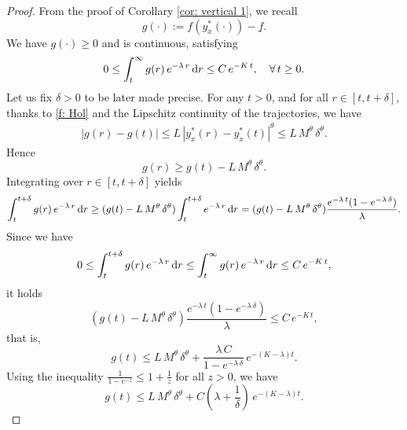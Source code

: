 \documentclass[12pt]{amsart}
\newcommand{\D}[1]{\mbox{\rm #1}}
\newcommand{\dd}{\D{d}}
\numberwithin{equation}{section}
\theoremstyle{plain}
\begin{document}
\begin{proof}
From the proof of Corollary \ref{cor: vertical 1}, we recall 
\begin{equation*}
    g(\cdot):= f(y_{x}^{*}(\cdot)) - \underline{f}.
\end{equation*}
We have $g(\cdot) \geq 0$ and is continuous, satisfying 
\begin{equation*}
    0\leq \int_{t}^{\infty} g(r)\,e^{-\lambda \,r}\,\dd r \leq C\, e^{-K\,t}, \quad \forall\,t\geq 0.
\end{equation*}
Let us fix $\delta>0$ to be later made precise. For any $t>0$, and for all $r\in [t,t+\delta]$, thanks to \ref{f: Hol} and the Lipschitz continuity of the trajectories, we have 
\begin{equation*}
\begin{aligned}
    |g(r) - g(t)| 
    \leq L \, |y_{x}^{*}(r) - y_{x}^{*}(t)|^{\theta} \leq L \, M^{\theta}\,\delta^{\theta}.
\end{aligned}
\end{equation*}
Hence
\begin{equation*}
    g(r) \geq g(t) - L\,M^{\theta}\,\delta^{\theta}.
\end{equation*}
Integrating over $r \in [t,t+\delta]$ yields
\begin{equation}
\label{eq: vertical_g}
    \int_{t}^{t+\delta} g(r)\,e^{-\lambda\,r}\,\dd r \geq (g(t) - L\,M^{\theta}\,\delta^{\theta}) \int_{t}^{t+\delta} e^{-\lambda\,r}\,\dd r = (g(t) - L\,M^{\theta}\,\delta^{\theta}) \frac{e^{-\lambda\,t} (1 - e^{-\lambda\,\delta})}{\lambda}.
\end{equation}
Since we have
\begin{equation*}
    0\leq \int_{t}^{t+\delta} g(r)\,e^{-\lambda\,r}\,\dd r
    \leq \int_{t}^{\infty} g(r)\,e^{-\lambda\,r}\,\dd r \leq C\, e^{-K\,t},
\end{equation*}
it holds
\begin{equation*}
    (g(t) - L\,M^{\theta}\,\delta^{\theta}) \frac{e^{-\lambda\,t} (1 - e^{-\lambda\,\delta})}{\lambda} 
    \leq C\, e^{-K\,t},
\end{equation*}
that is,
\begin{equation*}
    g(t) \leq L\,M^{\theta}\,\delta^{\theta} + \frac{\lambda\,C}{1 - e^{-\lambda\,\delta}}\, e^{-(K-\lambda)t}.
\end{equation*}
Using the inequality $\frac{1}{1-e^{-z}} \leq 1 + \frac{1}{z}$ for all $z>0$, we have
\begin{equation*}
    g(t) \leq L\,M^{\theta}\,\delta^{\theta} + C\left(\lambda + \frac{1}{\delta}\right)\, e^{-(K-\lambda)t}.

\end{equation*}
\end{proof}
\end{document}
